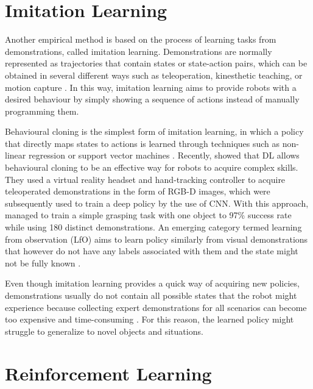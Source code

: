 \section{Imitation Learning}

Another empirical method is based on the process of learning tasks from demonstrations, called imitation learning. Demonstrations are normally represented as trajectories that contain states or state-action pairs, which can be obtained in several different ways such as teleoperation, kinesthetic teaching, or motion capture \cite{osa_algorithmic_2018}. In this way, imitation learning aims to provide robots with a desired behaviour by simply showing a sequence of actions instead of manually programming them.

Behavioural cloning is the simplest form of imitation learning, in which a policy that directly maps states to actions is learned through techniques such as non-linear regression or support vector machines \cite{osa_algorithmic_2018}. Recently, \citet{zhang_deep_2018} showed that DL allows behavioural cloning to be an effective way for robots to acquire complex skills. They used a virtual reality headset and hand-tracking controller to acquire teleoperated demonstrations in the form of RGB-D images, which were subsequently used to train a deep policy by the use of CNN. With this approach, \citeauthor{zhang_deep_2018} managed to train a simple grasping task with one object to 97\% success rate while using 180 distinct demonstrations. An emerging category termed learning from observation (LfO) aims to learn policy similarly from visual demonstrations that however do not have any labels associated with them and the state might not be fully known \cite{kroemer_review_2021}.

Even though imitation learning provides a quick way of acquiring new policies, demonstrations usually do not contain all possible states that the robot might experience because collecting expert demonstrations for all scenarios can become too expensive and time-consuming \cite{osa_algorithmic_2018}. For this reason, the learned policy might struggle to generalize to novel objects and situations.


\section{Reinforcement Learning}

